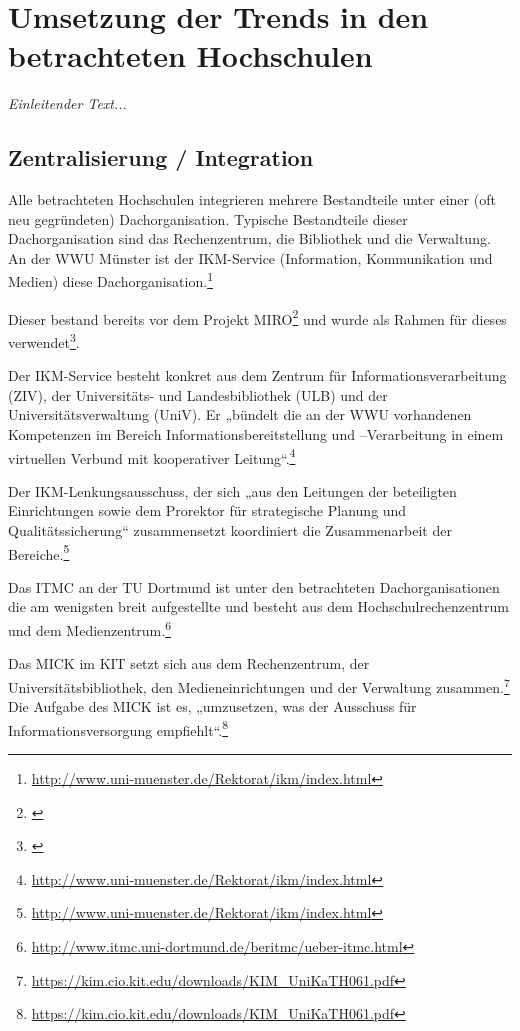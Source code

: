 \section{Umsetzung der Trends in den betrachteten Hochschulen}

\emph{Einleitender Text...}

\subsection{Zentralisierung / Integration}
Alle betrachteten Hochschulen integrieren mehrere Bestandteile unter einer (oft neu gegründeten) Dachorganisation. Typische Bestandteile dieser Dachorganisation sind das Rechenzentrum, die Bibliothek und die Verwaltung.
An der WWU Münster ist der IKM-Service (Information, Kommunikation und Medien) diese Dachorganisation.\footnote{\url{http://www.uni-muenster.de/Rektorat/ikm/index.html}}

Dieser bestand bereits vor dem Projekt MIRO\footnote{\cite[8]{vogl_bericht_2013}} und wurde als Rahmen für dieses verwendet\footnote{\cite[47]{bode_informationsmanagement_2010}}.

Der IKM-Service besteht konkret aus dem Zentrum für Informationsverarbeitung (ZIV), der Universitäts- und Landesbibliothek (ULB) und der Universitätsverwaltung (UniV). Er „bündelt die an der WWU vorhandenen Kompetenzen im Bereich Informationsbereitstellung und –Verarbeitung in einem virtuellen Verbund mit kooperativer Leitung“.\footnote{\url{http://www.uni-muenster.de/Rektorat/ikm/index.html}}

Der IKM-Lenkungsausschuss, der sich „aus den Leitungen der beteiligten Einrichtungen sowie dem Prorektor für strategische Planung und Qualitätssicherung“ zusammensetzt koordiniert die Zusammenarbeit der Bereiche.\footnote{\url{http://www.uni-muenster.de/Rektorat/ikm/index.html}}

Das ITMC an der TU Dortmund ist unter den betrachteten Dachorganisationen die am wenigsten breit aufgestellte und besteht aus dem Hochschulrechenzentrum und dem Medienzentrum.\footnote{\url{http://www.itmc.uni-dortmund.de/beritmc/ueber-itmc.html}}

Das MICK im KIT setzt sich aus dem Rechenzentrum, der Universitätsbibliothek, den Medieneinrichtungen und der Verwaltung zusammen.\footnote{\url{https://kim.cio.kit.edu/downloads/KIM_UniKaTH061.pdf}} Die Aufgabe des MICK ist es, „umzusetzen, was der Ausschuss für Informationsversorgung empfiehlt“.\footnote{\url{https://kim.cio.kit.edu/downloads/KIM_UniKaTH061.pdf}}

